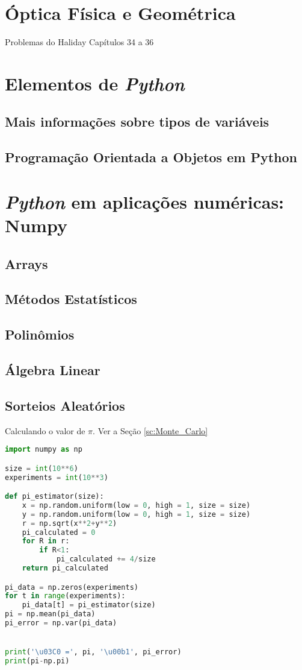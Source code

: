 \documentclass[12pt,a4paper,titlepage,portuges,twoside,final]{book}
\begin{document}


\chapter{Óptica Física e Geométrica}
Problemas do Haliday Capítulos 34 a 36




\appendix
\chapter{Elementos de {\it Python}}
\section{Mais informações sobre tipos de variáveis}\label{ap:1.1}
\section{Programação Orientada a Objetos em Python}\label{ap:1.2}

\chapter{{\it Python} em aplicações numéricas: Numpy}
\section{Arrays}
\section{Métodos Estatísticos}
\section{Polinômios}
\section{Álgebra Linear}
\section{Sorteios Aleatórios}

Calculando o valor de $\pi$. Ver a Seção \ref{sc:Monte_Carlo}
\begin{lstlisting}[language=Python, frame=lines,basicstyle=\footnotesize, caption={Estimando o valor de $\pi$ usando sorteios aleatórios}, label={lst:x+y}]
import numpy as np

size = int(10**6)
experiments = int(10**3)

def pi_estimator(size):
    x = np.random.uniform(low = 0, high = 1, size = size)
    y = np.random.uniform(low = 0, high = 1, size = size)
    r = np.sqrt(x**2+y**2)
    pi_calculated = 0
    for R in r:
        if R<1:
            pi_calculated += 4/size
    return pi_calculated

pi_data = np.zeros(experiments)
for t in range(experiments):
    pi_data[t] = pi_estimator(size)
pi = np.mean(pi_data)
pi_error = np.var(pi_data)


print('\u03C0 =', pi, '\u00b1', pi_error)
print(pi-np.pi)
\end{lstlisting}
\end{document}
